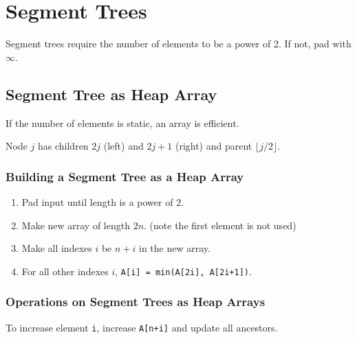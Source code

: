 \section{Segment Trees}

Segment trees require the number of elements to be a power of 2. If not, pad with $\infty$.


\subsection{Segment Tree as Heap Array}
If the number of elements is static, an array is efficient.

Node $j$ has children $2j$ (left) and $2j+1$ (right) and parent $\lfloor j/2 \rfloor$.

\subsubsection{Building a Segment Tree as a Heap Array}
\begin{enumerate}
    \item Pad input until length is a power of 2.
    \item Make new array of length $2n$. (note the first element is not used)
    \item Make all indexes $i$ be $n+i$ in the new array.
    \item For all other indexes $i$, \verb|A[i] = min(A[2i], A[2i+1])|.
\end{enumerate}
    
\subsubsection{Operations on Segment Trees as Heap Arrays}
To increase element \verb|i|, increase \verb|A[n+i]| and update all ancestors.


